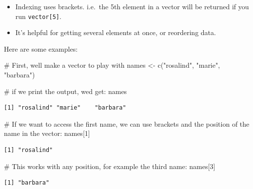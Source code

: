 \documentclass[
  letterpaper,
  DIV=11,
  numbers=noendperiod]{scrreprt}
\newenvironment{Shaded}{\begin{snugshade}}{\end{snugshade}}
\newcommand{\CommentTok}[1]{\textcolor[rgb]{0.37,0.37,0.37}{#1}}
\newcommand{\DecValTok}[1]{\textcolor[rgb]{0.68,0.00,0.00}{#1}}
\newcommand{\FunctionTok}[1]{\textcolor[rgb]{0.28,0.35,0.67}{#1}}
\newcommand{\NormalTok}[1]{\textcolor[rgb]{0.00,0.23,0.31}{#1}}
\newcommand{\OtherTok}[1]{\textcolor[rgb]{0.00,0.23,0.31}{#1}}
\newcommand{\StringTok}[1]{\textcolor[rgb]{0.13,0.47,0.30}{#1}}
\begin{document}
\begin{itemize}
\item
  Indexing uses brackets. i.e.~the 5th element in a vector will be
  returned if you run \texttt{vector{[}5{]}}.
\item
  It's helpful for getting several elements at once, or reordering data.
\end{itemize}

Here are some examples:

\begin{Shaded}
\begin{Highlighting}[]
\CommentTok{\# First, we\textquotesingle{}ll make a vector to play with}
\NormalTok{names }\OtherTok{\textless{}{-}} \FunctionTok{c}\NormalTok{(}\StringTok{"rosalind"}\NormalTok{, }\StringTok{"marie"}\NormalTok{, }\StringTok{"barbara"}\NormalTok{)}
\end{Highlighting}
\end{Shaded}

\begin{Shaded}
\begin{Highlighting}[]
\CommentTok{\# if we print the output, we\textquotesingle{}d get:}
\NormalTok{names}
\end{Highlighting}
\end{Shaded}

\begin{verbatim}
[1] "rosalind" "marie"    "barbara" 
\end{verbatim}

\begin{Shaded}
\begin{Highlighting}[]
\CommentTok{\# If we want to access the first name, we can use brackets and the position of the name in the vector:}
\NormalTok{names[}\DecValTok{1}\NormalTok{]}
\end{Highlighting}
\end{Shaded}

\begin{verbatim}
[1] "rosalind"
\end{verbatim}

\begin{Shaded}
\begin{Highlighting}[]
\CommentTok{\# This works with any position, for example the third name:}
\NormalTok{names[}\DecValTok{3}\NormalTok{]}
\end{Highlighting}
\end{Shaded}

\begin{verbatim}
[1] "barbara"
\end{verbatim}
\end{document}
